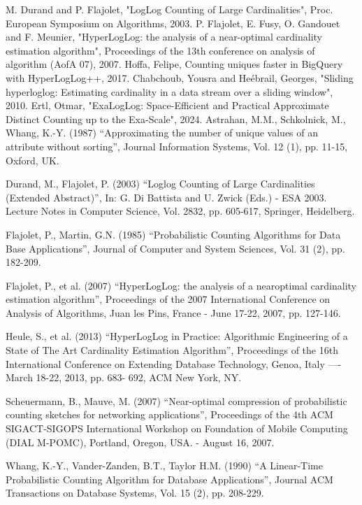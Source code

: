 \documentclass[a4paper,13pt]{article}
\theoremstyle{mytheor}
\begin{document}
\begin{thebibliography}{19}
     M. Durand and P. Flajolet, "LogLog Counting of Large Cardinalities", Proc. European Symposium on Algorithms, 2003.
     P. Flajolet, E. Fusy, O. Gandouet and F. Meunier, "HyperLogLog: the analysis of a near-optimal cardinality estimation algorithm", Proceedings of the 13th conference on analysis of algorithm (AofA 07), 2007.
     Hoffa, Felipe, Counting uniques faster in BigQuery with HyperLogLog++, 2017.
     Chabchoub, Yousra and He{\'e}brail, Georges, "Sliding hyperloglog: Estimating cardinality in a data stream over a sliding window", 2010.
     Ertl, Otmar, "ExaLogLog: Space-Efficient and Practical Approximate Distinct Counting up to the Exa-Scale", 2024.
    \bibitem
    [As87] Astrahan, M.M., Schkolnick, M., Whang, K.-Y. (1987)
    “Approximating the number of unique values of an attribute without
    sorting”, Journal Information Systems, Vol. 12 (1), pp. 11-15,
    Oxford, UK.
    
    \bibitem[Du03] Durand, M., Flajolet, P. (2003) “Loglog Counting of Large
    Cardinalities (Extended Abstract)”, In: G. Di Battista and U.
    Zwick (Eds.) - ESA 2003. Lecture Notes in Computer Science, Vol.
    2832, pp. 605-617, Springer, Heidelberg.
    
    \bibitem[Fl85] Flajolet, P., Martin, G.N. (1985) “Probabilistic Counting
    Algorithms for Data Base Applications”, Journal of Computer and
    System Sciences, Vol. 31 (2), pp. 182-209.
    
    \bibitem[Fl07] Flajolet, P., et al. (2007) “HyperLogLog: the analysis of a nearoptimal cardinality estimation algorithm”, Proceedings of the 2007
    International Conference on Analysis of Algorithms, Juan les Pins,
    France - June 17-22, 2007, pp. 127-146.
    
    \bibitem[He13] Heule, S., et al. (2013) “HyperLogLog in Practice: Algorithmic
    Engineering of a State of The Art Cardinality Estimation Algorithm”, Proceedings of the 16th International Conference on Extending
    Database Technology, Genoa, Italy —- March 18-22, 2013, pp. 683-
    692, ACM New York, NY.
    
    \bibitem[Sc07] Scheuermann, B., Mauve, M. (2007) “Near-optimal compression
    of probabilistic counting sketches for networking applications”,
    Proceedings of the 4th ACM SIGACT-SIGOPS International
    Workshop on Foundation of Mobile Computing (DIAL M-POMC),
    Portland, Oregon, USA. - August 16, 2007.
    
    \bibitem[Wh90] Whang, K.-Y., Vander-Zanden, B.T., Taylor H.M. (1990)
    “A Linear-Time Probabilistic Counting Algorithm for Database
    Applications”, Journal ACM Transactions on Database Systems,
    Vol. 15 (2), pp. 208-229.
\end{thebibliography}
\end{document}

